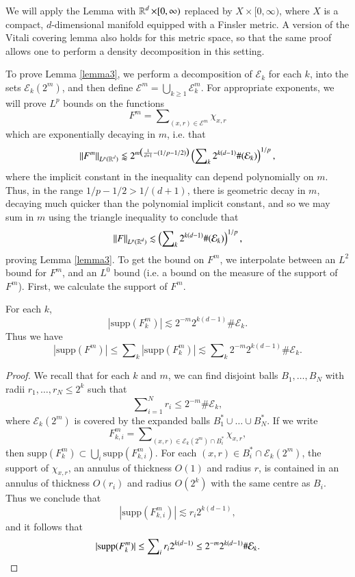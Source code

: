 \begin{remark}
  We will apply the Lemma with $\operatorname{\mathbb{R}}^d \times [0,\infty)$ replaced by $X \times [0,\infty)$, where $X$ is a compact, $d$-dimensional manifold equipped with a Finsler metric. A version of the Vitali covering lemma also holds for this metric space, so that the same proof allows one to perform a density decomposition in this setting.
\end{remark}

To prove Lemma \ref{lemma3}, we perform a decomposition of $\mathcal{E}_k$ for each $k$, into the sets $\mathcal{E}_k(2^m)$, and then define $\mathcal{E}^m = \bigcup_{k \geq 1} \mathcal{E}_k^m$. For appropriate exponents, we will prove $L^p$ bounds on the functions
%
\[ F^m = \sum\nolimits_{(x,r) \in \mathcal{E}^m} \chi_{x,r} \]
%
which are exponentially decaying in $m$, i.e. that
%
\[ \| F^m \|_{L^p(\operatorname{\mathbb{R}}^d)} \lessapprox 2^{m \big( \frac{1}{d+1} - (1/p - 1/2) \big)} \left( \sum\nolimits_k 2^{k(d-1)} \#(\mathcal{E}_k) \right)^{1/p}, \]
%
where the implicit constant in the inequality can depend polynomially on $m$. Thus, in the range $1/p - 1/2 > 1/(d+1)$, there is geometric decay in $m$, decaying much quicker than the polynomial implicit constant, and so we may sum in $m$ using the triangle inequality to conclude that
%
\[ \| F \|_{L^p(\operatorname{\mathbb{R}}^d)} \lesssim \left( \sum\nolimits_k 2^{k(d-1)} \#(\mathcal{E}_k) \right)^{1/p}, \]
%
proving Lemma \ref{lemma3}. To get the bound on $F^m$, we interpolate between an $L^2$ bound for $F^m$, and an $L^0$ bound (i.e. a bound on the measure of the support of $F^m$). First, we calculate the support of $F^m$.

\begin{lemma} \label{lemma5}
    For each $k$,
    \[ |\text{supp}(F^m_k)| \lesssim 2^{-m} 2^{k(d-1)} \# \mathcal{E}_k. \]
    Thus we have
    \[ |\text{supp}(F^m)| \leq \sum\nolimits_k |\text{supp}(F^m_k)| \lesssim \sum\nolimits_k 2^{-m} 2^{k(d-1)} \# \mathcal{E}_k. \]
\end{lemma}
\begin{proof}
    We recall that for each $k$ and $m$, we can find disjoint balls $B_1,\dots,B_N$ with radii $r_1,\dots,r_N \leq 2^k$ such that
    \[ \sum\nolimits_{i = 1}^N r_i \leq 2^{-m} \# \mathcal{E}_k, \]
    where $\mathcal{E}_k(2^m)$ is covered by the expanded balls $B_1^* \cup \dots \cup B_N^*$. If we write
    \[ F^m_{k,i} = \sum\nolimits_{(x,r) \in \mathcal{E}_k(2^m) \cap B_i^*} \chi_{x,r}, \]
    then $\text{supp}(F^m_k) \subset \bigcup_i \text{supp}(F^m_{k,i})$. For each $(x,r) \in B_i^* \cap \mathcal{E}_k(2^m)$, the support of $\chi_{x,r}$, an annulus of thickness $O(1)$ and radius $r$, is contained in an annulus of thickness $O(r_i)$ and radius $O(2^k)$ with the same centre as $B_i$. Thus we conclude that
    \[ |\text{supp}(F^m_{k,i})| \lesssim r_i 2^{k(d-1)}, \]
    and it follows that
    \[ |\text{supp}(F^m_k)| \leq \sum\nolimits_i r_i 2^{k(d-1)} \leq 2^{-m} 2^{k(d-1)} \# \mathcal{E}_k. \qedhere \]
\end{proof}

